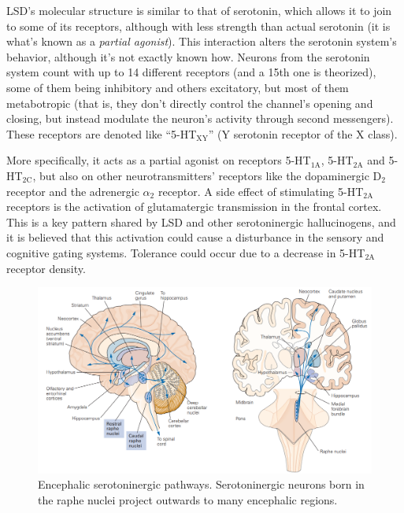 LSD's molecular structure is similar to that of serotonin, which allows it to join to some of its receptors, although with less strength than actual serotonin (it is what's known as a \textit{partial agonist}). This interaction alters the serotonin system's behavior, although it's not exactly known how. Neurons from the serotonin system count with up to 14 different receptors (and a 15th one is theorized), some of them being inhibitory and others excitatory, but most of them metabotropic (that is, they don't directly control the channel's opening and closing, but instead modulate the neuron's activity through second messengers). These receptors are denoted like \enquote{5-HT$_{\textrm{XY}}$} (Y serotonin receptor of the X class).

More specifically, it acts as a partial agonist on receptors 5-HT$_{\textrm{1A}}$, 5-HT$_{\textrm{2A}}$ and 5-HT$_{\textrm{2C}}$, but also on other neurotransmitters' receptors like the dopaminergic D$_2$ receptor and the adrenergic $\alpha_2$ receptor. A side effect of stimulating 5-HT$_{\textrm{2A}}$ receptors is the activation of glutamatergic transmission in the frontal cortex. This is a key pattern shared by LSD and other serotoninergic hallucinogens, and it is believed that this activation could cause a disturbance in the sensory and cognitive gating systems. Tolerance could occur due to a decrease in 5-HT$_{\textrm{2A}}$ receptor density.

\begin{figure}[H]
	\centering
	\includegraphics[width=\linewidth]{media/9-pathways.png}
	\caption{Encephalic serotoninergic pathways. Serotoninergic neurons born in the raphe nuclei project outwards to many encephalic regions.}
	\label{pathways}
\end{figure}

\newpage
